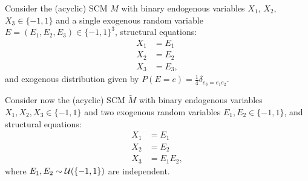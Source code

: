 \begin{Eg}\label{ex:confounding_bidirected_edges} %
  Consider the (acyclic) SCM $M$ with binary endogenous variables $X_1$, $X_2$, $X_3 \in \{-1,1\}$ and a single exogenous random variable $E = (E_1,E_2,E_3) \in \{-1,1\}^3$, structural equations:
  $$\begin{aligned}
    X_1 &= E_1 \\
    X_2 &= E_2 \\
    X_3 &= E_3,
  \end{aligned}$$
  and exogenous distribution given by
  $P(E=e)=\tfrac{1}{4} \delta_{e_3 = e_1 e_2}$.

  Consider now the (acyclic) SCM $\tilde{M}$ with binary endogenous variables $X_1, X_2, X_3 \in \{-1,1\}$ and two exogenous random variables $E_1, E_2 \in \{-1,1\}$, and structural equations:
  $$\begin{aligned} 
      X_1 &= E_1 \\
      X_2 &= E_2 \\
      X_3 &= E_1 E_2,
    \end{aligned}$$
  where $E_1, E_2 \sim \mathcal{U}(\{-1,1\})$ are independent.


\end{Eg}
